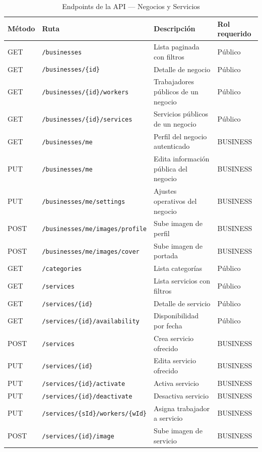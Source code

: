 \documentclass[12pt,a4paper,twoside]{report}
\begin{document}
\begin{table}[htbp]
\centering
\scriptsize
\caption{Endpoints de la API — Negocios y Servicios}
\label{tab:endpoints-biz}
\begin{tabularx}{\textwidth}{@{}L{0.10\textwidth}L{0.36\textwidth}Y L{0.18\textwidth}@{}}
\toprule
Método & Ruta & Descripción & Rol requerido \\
\midrule
GET  & \texttt{/businesses} & Lista paginada con filtros & Público \\
GET  & \texttt{/businesses/\{id\}} & Detalle de negocio & Público \\
GET  & \texttt{/businesses/\{id\}/workers} & Trabajadores públicos de un negocio & Público \\
GET  & \texttt{/businesses/\{id\}/services} & Servicios públicos de un negocio & Público \\
GET  & \texttt{/businesses/me} & Perfil del negocio autenticado & BUSINESS \\
PUT  & \texttt{/businesses/me} & Edita información pública del negocio & BUSINESS \\
PUT  & \texttt{/businesses/me/settings} & Ajustes operativos del negocio & BUSINESS \\
POST & \texttt{/businesses/me/images/profile} & Sube imagen de perfil & BUSINESS \\
POST & \texttt{/businesses/me/images/cover} & Sube imagen de portada & BUSINESS \\
GET  & \texttt{/categories} & Lista categorías & Público \\
GET  & \texttt{/services} & Lista servicios con filtros & Público \\
GET  & \texttt{/services/\{id\}} & Detalle de servicio & Público \\
GET  & \texttt{/services/\{id\}/availability} & Disponibilidad por fecha & Público \\
POST & \texttt{/services} & Crea servicio ofrecido & BUSINESS \\
PUT  & \texttt{/services/\{id\}} & Edita servicio ofrecido & BUSINESS \\
PUT  & \texttt{/services/\{id\}/activate} & Activa servicio & BUSINESS \\
PUT  & \texttt{/services/\{id\}/deactivate} & Desactiva servicio & BUSINESS \\
PUT  & \texttt{/services/\{sId\}/workers/\{wId\}} & Asigna trabajador a servicio & BUSINESS \\
POST & \texttt{/services/\{id\}/image} & Sube imagen de servicio & BUSINESS \\
\bottomrule
\end{tabularx}
\end{table}
\end{document}
